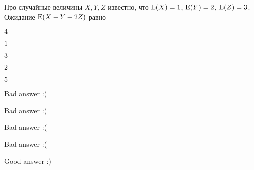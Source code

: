 
\begin{question}
Про случайные величины \(X, Y, Z\) известно, что \(\operatorname{E}(X)=1\),
\(\operatorname{E}(Y)=2\), \(\operatorname{E}(Z)=3\). Ожидание \(\operatorname{E}(X-Y+2Z)\) равно
\begin{answerlist}
  \item \(4\)
  \item \(1\)
  \item \(3\)
  \item \(2\)
  \item \(5\)
\end{answerlist}
\end{question}

\begin{solution}
\begin{answerlist}
  \item Bad answer :(
  \item Bad answer :(
  \item Bad answer :(
  \item Bad answer :(
  \item Good answer :)
\end{answerlist}
\end{solution}

